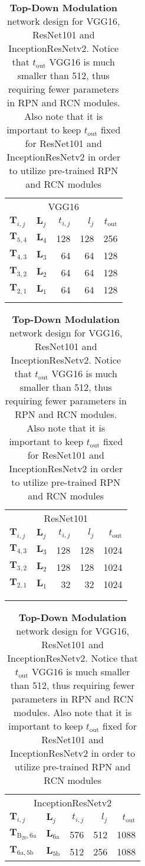 \documentclass[10pt,twocolumn,letterpaper]{article}
\begin{document}
\begin{table}[t]
\footnotesize
\centering
\caption{\textbf{Top-Down Modulation} network design for VGG16, ResNet101 and InceptionResNetv2. Notice that $t_\text{out}$ VGG16 is much smaller than 512, thus requiring fewer parameters in RPN and RCN modules. Also note that it is important to keep $t_\text{out}$ fixed for ResNet101 and InceptionResNetv2 in order to utilize pre-trained RPN and RCN modules\vspace{0.05in}}
\label{tab:tdm_capacity}
\begin{tabular}{@{}llrrr@{}}
\toprule
\multicolumn{5}{c}{VGG16} \\
\arrayrulecolor{gray}
\midrule
\arrayrulecolor{black}
$\mathbf{T}_{i,j}$ & $\mathbf{L}_{j}$ & $t_{i,j}$ & $l_j$ & $t_\text{out}$ \\
\midrule
$\mathbf{T}_{5,4}$ & $\mathbf{L}_{4}$ & 128 & 128 & 256 \\
$\mathbf{T}_{4,3}$ & $\mathbf{L}_{3}$ & 64 & 64 & 128 \\
$\mathbf{T}_{3,2}$ & $\mathbf{L}_{2}$ & 64 & 64 & 128 \\
$\mathbf{T}_{2,1}$ & $\mathbf{L}_{1}$ & 64 & 64 & 128 \\
\bottomrule
\\
\end{tabular}
\quad 
\begin{tabular}{@{}llrrr@{}}
\toprule
\multicolumn{5}{c}{ResNet101} \\
\arrayrulecolor{gray}
\midrule
\arrayrulecolor{black}
$\mathbf{T}_{i,j}$ & $\mathbf{L}_{j}$ & $t_{i,j}$ & $l_j$ & $t_\text{out}$ \\
\midrule
$\mathbf{T}_{4,3}$ & $\mathbf{L}_{3}$ & 128 & 128 & 1024 \\
$\mathbf{T}_{3,2}$ & $\mathbf{L}_{2}$ & 128 & 128 & 1024 \\
$\mathbf{T}_{2,1}$ & $\mathbf{L}_{1}$ & 32 & 32 & 1024 \\
\bottomrule
\\
\\
\end{tabular}
\begin{tabular}{@{}llrrr@{}}
\toprule
\multicolumn{5}{c}{InceptionResNetv2} \\
\arrayrulecolor{gray}
\midrule
\arrayrulecolor{black}
$\mathbf{T}_{i,j}$ & $\mathbf{L}_{j}$ & $t_{i,j}$ & $l_j$ & $t_\text{out}$ \\
\midrule
$\mathbf{T}_{\text{B}_{20},\text{6a}}$ & $\mathbf{L}_{6\text{a}}$ & 576 & 512 & 1088 \\
$\mathbf{T}_{6\text{a},5\text{b}}$ & $\mathbf{L}_{5\text{b}}$ & 512 & 256 & 1088 \\
\bottomrule
\end{tabular}
\vspace{-0.1in}
\end{table}
\end{document}
